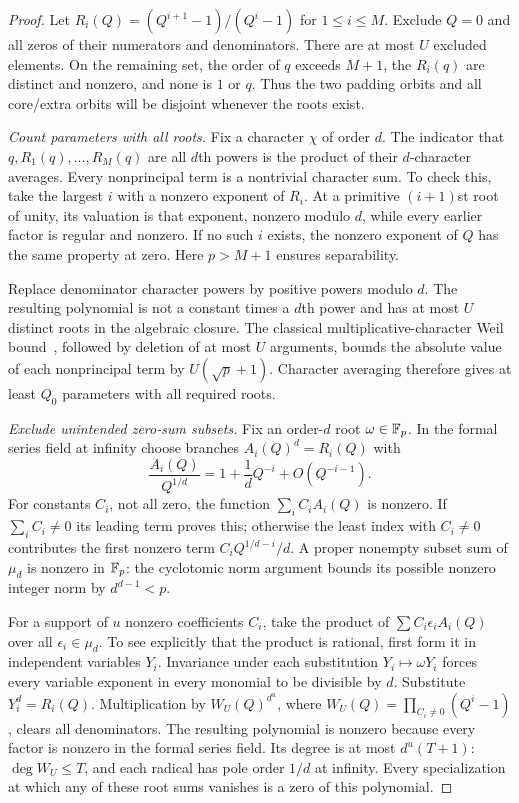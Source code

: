 \begin{proof}
Let
$R_i(Q)=(Q^{i+1}-1)/(Q^i-1)$ for $1\le i\le M$.
Exclude $Q=0$ and all zeros of their numerators and denominators.
There are at most $U$ excluded elements. On the remaining set, the order
of $q$ exceeds $M+1$, the $R_i(q)$ are distinct and nonzero, and none
is $1$ or $q$. Thus the two padding orbits and all core/extra orbits
will be disjoint whenever the roots exist.

\emph{Count parameters with all roots.}
Fix a character $\chi$ of order $d$. The indicator that
$q,R_1(q),\ldots,R_M(q)$ are all $d$th powers is the product of their
$d$-character averages. Every nonprincipal term is a nontrivial
character sum. To check this, take the largest $i$ with a nonzero
exponent of $R_i$. At a primitive $(i+1)$st root of unity, its valuation
is that exponent, nonzero modulo $d$, while every earlier factor is
regular and nonzero. If no such $i$ exists, the nonzero exponent of $Q$
has the same property at zero. Here $p>M+1$ ensures separability.

Replace denominator character powers by positive powers modulo $d$.
The resulting polynomial is not a constant times a $d$th power and
has at most $U$ distinct roots in the algebraic closure. The classical
multiplicative-character Weil bound~\cite[Lemma~2]{sarkozy-blocks},
followed by deletion of at most
$U$ arguments, bounds the absolute value of each nonprincipal term
by $U(\sqrt p+1)$. Character averaging therefore gives at least $Q_0$
parameters with all required roots.

\emph{Exclude unintended zero-sum subsets.}
Fix an order-$d$ root $\omega\in\mathbb F_p$. In the formal series field at
infinity choose branches $A_i(Q)^d=R_i(Q)$ with
\[
 \frac{A_i(Q)}{Q^{1/d}}
 =1+\frac1dQ^{-i}+O(Q^{-i-1}).
\]
For constants $C_i$, not all zero, the function $\sum_i C_iA_i(Q)$
is nonzero. If $\sum_i C_i\ne0$ its leading term proves this;
otherwise the least index with $C_i\ne0$ contributes the first
nonzero term $C_iQ^{1/d-i}/d$.
A proper nonempty subset sum of $\mu_d$ is nonzero in $\mathbb F_p$:
the cyclotomic norm argument bounds its possible nonzero integer norm
by $d^{d-1}<p$.

For a support of $u$ nonzero coefficients $C_i$, take the product of
$\sum C_i\epsilon_i A_i(Q)$ over all $\epsilon_i\in\mu_d$.
To see explicitly that the product is rational, first form it in
independent variables $Y_i$. Invariance under each substitution
$Y_i\mapsto\omega Y_i$ forces every variable exponent in every monomial
to be divisible by $d$. Substitute $Y_i^d=R_i(Q)$.
Multiplication by $W_U(Q)^{d^u}$, where
$W_U(Q)=\prod_{C_i\ne0}(Q^i-1)$, clears all denominators.
The resulting polynomial is nonzero because every factor is nonzero
in the formal series field. Its degree is at most $d^u(T+1)$:
$\deg W_U\le T$, and each radical has pole order $1/d$ at infinity.
Every specialization at which any of these root sums vanishes is a
zero of this polynomial.


\end{proof}
